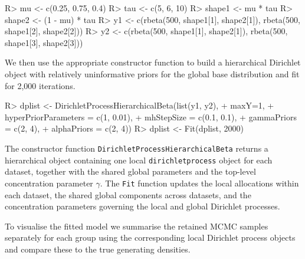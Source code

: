 \documentclass[nojss]{jss}
\begin{document}
\begin{CodeInput}
R> mu <- c(0.25, 0.75, 0.4)
R> tau <- c(5, 6, 10)
R> shape1 <- mu * tau
R> shape2 <- (1 - mu) * tau
R> y1 <- c(rbeta(500, shape1[1], shape2[1]), rbeta(500, shape1[2], shape2[2]))
R> y2 <- c(rbeta(500, shape1[1], shape2[1]), rbeta(500, shape1[3], shape2[3]))
\end{CodeInput}

We then use the appropriate constructor function to build a hierarchical Dirichlet object
with relatively uninformative priors for the global base distribution and fit for 2,000 iterations.

\begin{CodeInput}
R> dplist <- DirichletProcessHierarchicalBeta(list(y1, y2),
+                                            maxY=1,
+                                            hyperPriorParameters = c(1, 0.01),
+                                            mhStepSize = c(0.1, 0.1),
+                                            gammaPriors = c(2, 4),
+                                            alphaPriors = c(2, 4))
R> dplist <- Fit(dplist, 2000)
\end{CodeInput}

The constructor function \texttt{DirichletProcessHierarchicalBeta} returns a hierarchical
object containing one local \texttt{dirichletprocess} object for each dataset, together with the
shared global parameters and the top-level concentration parameter $\gamma$. The
\texttt{Fit} function updates the local allocations within each dataset, the shared global
components across datasets, and the concentration parameters governing the local and global
Dirichlet processes.

To visualise the fitted model we summarise the retained MCMC samples separately for each
group using the corresponding local Dirichlet process objects and compare these to the true
generating densities.
\end{document}
